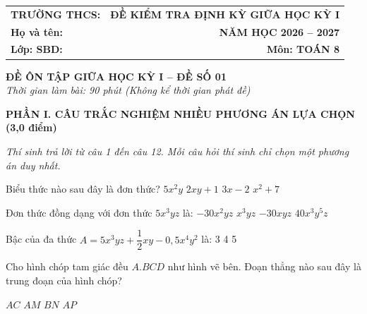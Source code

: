 \documentclass[12pt,a4paper]{article}
\begin{document}
\noindent
\begin{tabularx}{\linewidth}{X r}
\textbf{TRƯỜNG THCS: \dotfill} & \textbf{ĐỀ KIỂM TRA ĐỊNH KỲ GIỮA HỌC KỲ I} \\
\textbf{Họ và tên: \dotfill} & \textbf{NĂM HỌC 2026 -- 2027} \\
\textbf{Lớp: \dotfill \quad SBD: \dotfill} & \textbf{Môn: TOÁN 8} \\
\hline
\end{tabularx}
\vspace{2mm}

\begin{center}
  \textbf{\large ĐỀ ÔN TẬP GIỮA HỌC KỲ I -- ĐỀ SỐ 01}\\
  \textit{Thời gian làm bài: 90 phút (Không kể thời gian phát đề)}
\end{center}
\vspace{1mm}

\noindent\textbf{\large PHẦN I. CÂU TRẮC NGHIỆM NHIỀU PHƯƠNG ÁN LỰA CHỌN (3,0 điểm)}

\textit{Thí sinh trả lời từ câu 1 đến câu 12. Mỗi câu hỏi thí sinh chỉ chọn một phương án duy nhất.}

\vspace{1mm}
\begin{ex}
Biểu thức nào sau đây là đơn thức?
\choice
{\True $5x^2y$}
{$2xy + 1$}
{$3x - 2$}
{$x^2 + 7$}
\end{ex}

\begin{ex}
Đơn thức đồng dạng với đơn thức $5x^3yz$ là:
\choice
{$-30x^2yz$}
{\True $x^3yz$}
{$-30xyz$}
{$40x^3y^5z$}
\end{ex}

\begin{ex}
Bậc của đa thức $A = 5x^3yz + \dfrac{1}{2}xy - 0{,}5x^4y^2$ là:
\choice
{3}
{4}
{5}
{}
\end{ex}

\begin{ex}
Cho hình chóp tam giác đều $A.BCD$ như hình vẽ bên. Đoạn thẳng nào sau đây là trung đoạn của hình chóp?
\begin{center}
\end{center}
\choice
{$AC$}
{\True $AM$}
{$BN$}
{$AP$}
\end{ex}
\end{document}
